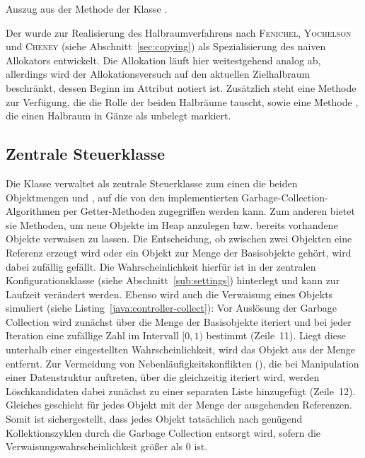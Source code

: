\begin{listing}[h]
	\inputminted[]{java}{code/NaiveAlloc-allocate.java}
	\caption[Methode  der Klasse ]{Auszug aus der Methode  der Klasse .}
	\label{java:naive-alloc}
\end{listing}

Der  wurde zur Realisierung des Halbraumverfahrens nach \textsc{Fenichel}, \textsc{Yochelson} und \textsc{Cheney} (siehe Abschnitt~\ref{sec:copying}) als Spezialisierung des naiven Allokators entwickelt.
Die Allokation läuft hier weitestgehend analog ab, allerdings wird der Allokationsversuch auf den aktuellen Zielhalbraum beschränkt, dessen Beginn im Attribut  notiert ist.
Zusätzlich steht eine Methode  zur Verfügung, die die Rolle der beiden Halbräume tauscht, sowie eine Methode , die einen Halbraum in Gänze als unbelegt markiert.

\subsection{Zentrale Steuerklasse }
\label{sub:controller}
Die Klasse  verwaltet als zentrale Steuerklasse zum einen die beiden Objektmengen  und , auf die von den implementierten Garbage-Collection-Algorithmen per Getter-Methoden zugegriffen werden kann.
Zum anderen bietet sie Methoden, um neue Objekte im Heap anzulegen bzw. bereits vorhandene Objekte verwaisen zu lassen.
Die Entscheidung, ob zwischen zwei Objekten eine Referenz erzeugt wird oder ein Objekt zur Menge der Basisobjekte gehört, wird dabei zufällig gefällt.
Die Wahrscheinlichkeit hierfür ist in der zentralen Konfigurationsklasse  (siehe Abschnitt~\ref{sub:settings}) hinterlegt und kann zur Laufzeit verändert werden.
Ebenso wird auch die Verwaisung eines Objekts simuliert (siehe Listing~\ref{java:controller-collect}):
Vor Auslösung der Garbage Collection wird zunächst über die Menge der Basisobjekte iteriert und bei jeder Iteration eine zufällige Zahl im Intervall $[0,1)$ bestimmt (Zeile~11).
Liegt diese unterhalb einer eingestellten Wahrscheinlichkeit, wird das Objekt aus der Menge  entfernt.
Zur Vermeidung von Nebenläufigkeitskonflikten (), die bei Manipulation einer Datenstruktur auftreten, über die gleichzeitig iteriert wird, werden Löschkandidaten dabei zunächst zu einer separaten Liste hinzugefügt (Zeile~12).
Gleiches geschieht für jedes Objekt mit der Menge  der ausgehenden Referenzen.
Somit ist sichergestellt, dass jedes Objekt tatsächlich nach genügend Kollektionszyklen durch die Garbage Collection entsorgt wird, sofern die Verwaisungswahrscheinlichkeit größer als $0$ ist.

